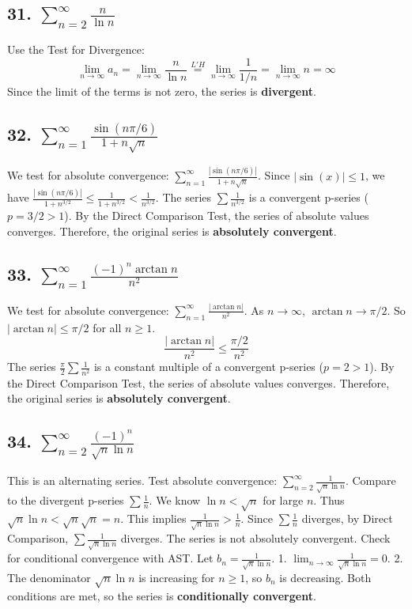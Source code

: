 \documentclass{article}
\begin{document}
\subsection*{31. $\sum_{n=2}^{\infty} \frac{n}{\ln n}$}
Use the Test for Divergence:
\[ \lim_{n \to \infty} a_n = \lim_{n \to \infty} \frac{n}{\ln n} \overset{L'H}{=} \lim_{n \to \infty} \frac{1}{1/n} = \lim_{n \to \infty} n = \infty \]
Since the limit of the terms is not zero, the series is \textbf{divergent}.

\subsection*{32. $\sum_{n=1}^{\infty} \frac{\sin(n\pi/6)}{1+n\sqrt{n}}$}
We test for absolute convergence: $\sum_{n=1}^{\infty} \frac{|\sin(n\pi/6)|}{1+n\sqrt{n}}$.
Since $|\sin(x)| \le 1$, we have $\frac{|\sin(n\pi/6)|}{1+n^{3/2}} \le \frac{1}{1+n^{3/2}} < \frac{1}{n^{3/2}}$.
The series $\sum \frac{1}{n^{3/2}}$ is a convergent p-series ($p=3/2 > 1$).
By the Direct Comparison Test, the series of absolute values converges.
Therefore, the original series is \textbf{absolutely convergent}.

\subsection*{33. $\sum_{n=1}^{\infty} \frac{(-1)^n \arctan n}{n^2}$}
We test for absolute convergence: $\sum_{n=1}^{\infty} \frac{|\arctan n|}{n^2}$.
As $n \to \infty$, $\arctan n \to \pi/2$. So $|\arctan n| \le \pi/2$ for all $n \ge 1$.
\[ \frac{|\arctan n|}{n^2} \le \frac{\pi/2}{n^2} \]
The series $\frac{\pi}{2} \sum \frac{1}{n^2}$ is a constant multiple of a convergent p-series ($p=2>1$).
By the Direct Comparison Test, the series of absolute values converges.
Therefore, the original series is \textbf{absolutely convergent}.

\subsection*{34. $\sum_{n=2}^{\infty} \frac{(-1)^n}{\sqrt{n}\ln n}$}
This is an alternating series. Test absolute convergence: $\sum_{n=2}^{\infty} \frac{1}{\sqrt{n}\ln n}$.
Compare to the divergent p-series $\sum \frac{1}{n}$. We know $\ln n < \sqrt{n}$ for large $n$. Thus $\sqrt{n}\ln n < \sqrt{n}\sqrt{n} = n$. This implies $\frac{1}{\sqrt{n}\ln n} > \frac{1}{n}$.
Since $\sum \frac{1}{n}$ diverges, by Direct Comparison, $\sum \frac{1}{\sqrt{n}\ln n}$ diverges. The series is not absolutely convergent.
Check for conditional convergence with AST. Let $b_n = \frac{1}{\sqrt{n}\ln n}$.
1. $\lim_{n \to \infty} \frac{1}{\sqrt{n}\ln n} = 0$.
2. The denominator $\sqrt{n}\ln n$ is increasing for $n \ge 1$, so $b_n$ is decreasing.
Both conditions are met, so the series is \textbf{conditionally convergent}.
\end{document}
